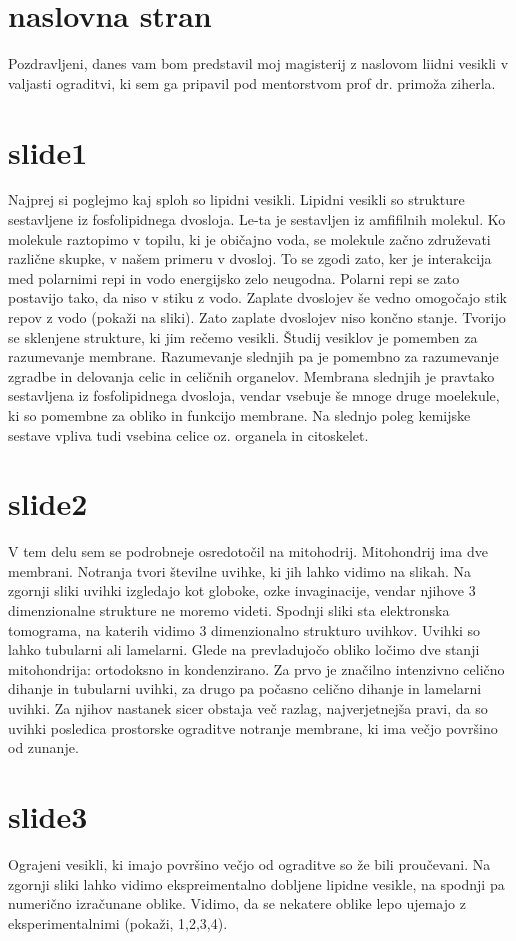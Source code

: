 \documentclass[openany, longbibliography,slovene,a4paper,12pt]{book}
\begin{document}
\section{naslovna stran}
Pozdravljeni,
danes vam bom predstavil moj magisterij z naslovom liidni vesikli v valjasti ograditvi, ki sem ga pripavil pod mentorstvom prof dr. primoža ziherla.
\section{slide1}
Najprej si poglejmo kaj sploh so lipidni vesikli. Lipidni vesikli so strukture sestavljene iz fosfolipidnega dvosloja. Le-ta je sestavljen iz amfifilnih molekul. Ko molekule raztopimo v topilu, ki je običajno voda, se molekule začno združevati različne skupke, v našem primeru v dvosloj. To se zgodi zato, ker je interakcija med polarnimi repi in vodo energijsko zelo neugodna. Polarni repi se zato postavijo tako, da niso v stiku z vodo. Zaplate dvoslojev še vedno omogočajo stik repov z vodo (pokaži na sliki). Zato zaplate dvoslojev niso končno stanje. Tvorijo se sklenjene strukture, ki jim rečemo vesikli. Študij vesiklov je pomemben za razumevanje membrane. Razumevanje slednjih pa je pomembno za razumevanje zgradbe in delovanja celic in celičnih organelov. Membrana slednjih je pravtako sestavljena iz fosfolipidnega dvosloja, vendar vsebuje še mnoge druge moelekule, ki so pomembne za obliko in funkcijo membrane. Na slednjo poleg kemijske sestave vpliva tudi vsebina celice oz. organela in citoskelet.

\section{slide2}
V tem delu sem se podrobneje osredotočil na mitohodrij. Mitohondrij ima dve membrani. Notranja tvori številne uvihke, ki jih lahko vidimo na slikah. Na zgornji sliki uvihki izgledajo kot globoke, ozke invaginacije, vendar njihove 3 dimenzionalne strukture ne moremo videti. Spodnji sliki sta elektronska tomograma, na katerih vidimo 3 dimenzionalno strukturo uvihkov. Uvihki so lahko tubularni ali lamelarni. Glede na prevladujočo obliko ločimo dve stanji mitohondrija: ortodoksno in kondenzirano. Za prvo je značilno intenzivno celično dihanje in tubularni uvihki, za drugo pa počasno celično dihanje in lamelarni uvihki. Za njihov nastanek sicer obstaja več razlag, najverjetnejša pravi, da so uvihki posledica prostorske ograditve notranje membrane, ki ima večjo površino od zunanje.

\section{slide3}
Ograjeni vesikli, ki imajo površino večjo od ograditve so že bili proučevani. Na zgornji sliki lahko vidimo ekspreimentalno dobljene lipidne vesikle, na spodnji pa numerično izračunane oblike. Vidimo, da se nekatere oblike lepo ujemajo z eksperimentalnimi (pokaži, 1,2,3,4).
\end{document}

